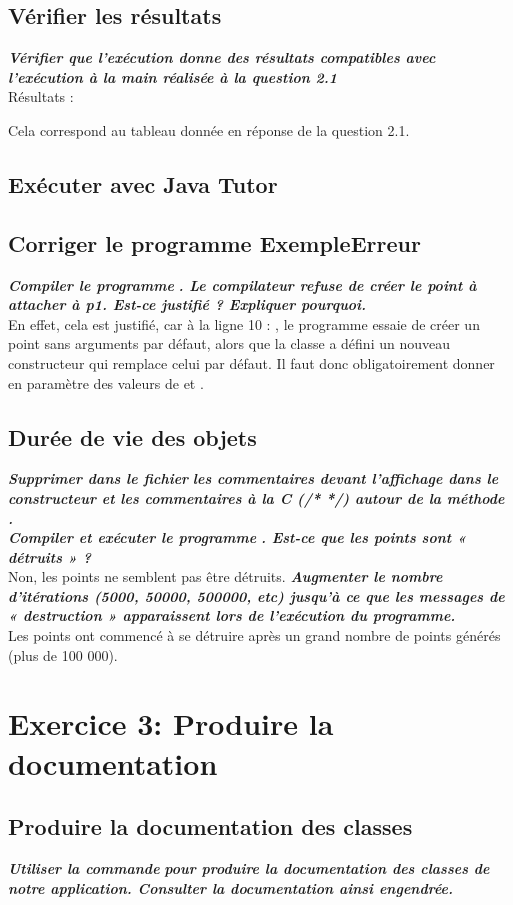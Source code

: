 \documentclass{sebaClass}
\newcommand{\q}[1]{\textit{\textbf{#1}}\\}
\newcommand{\ql}[1]{\textit{\textbf{#1}}}
\begin{document}
\subsection{Vérifier les résultats}
\q{Vérifier que l’exécution donne des résultats compatibles avec l’exécution à la main réalisée à la question 2.1}
Résultats :

Cela correspond au tableau donnée en réponse de la question 2.1.
\subsection{Exécuter avec Java Tutor}
\subsection{Corriger le programme ExempleErreur}
\ql{Compiler le programme} \q{. Le compilateur refuse de créer le point à attacher à p1. Est-ce justifié ? Expliquer pourquoi.}
En effet, cela est justifié, car à la ligne 10 : , le programme  essaie de créer
un point sans arguments par défaut, alors que la classe  a défini un nouveau constructeur qui remplace celui par défaut. Il faut donc
obligatoirement donner en paramètre des valeurs de  et .
\subsection{Durée de vie des objets}
\ql{Supprimer dans le fichier}  \ql{les commentaires devant l’affichage dans le constructeur et les commentaires
   à la C (/* */) autour de la méthode} \q{.}
\ql{Compiler et exécuter le programme} \q{. Est-ce que les points sont « détruits » ?}
Non, les points ne semblent pas être détruits.
\q{Augmenter le nombre d’itérations (5000, 50000, 500000, etc) jusqu’à ce que les messages de « destruction » apparaissent lors de l’exécution du
   programme.}
Les points ont commencé à se détruire après un grand nombre de points générés (plus de 100 000).
\section{Exercice 3: Produire la documentation}
\subsection{Produire la documentation des classes}
\ql{Utiliser la commande}  \q{pour produire la documentation des classes de notre application. Consulter la documentation ainsi
   engendrée.}
\end{document}

